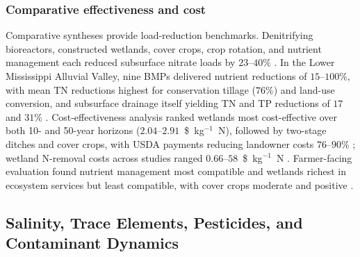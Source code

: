 \subsubsection{Comparative effectiveness and cost}

Comparative syntheses provide load-reduction benchmarks. Denitrifying
bioreactors, constructed wetlands, cover crops, crop rotation, and nutrient
management each reduced subsurface nitrate loads by $23$--$40\%$
\parencite{Yuan2022}. In the Lower Mississippi Alluvial Valley, nine BMPs
delivered nutrient reductions of $15$--$100\%$, with mean TN reductions
highest for conservation tillage ($76\%$) and land-use conversion, and
subsurface drainage itself yielding TN and TP reductions of $17$ and $31\%$
\parencite{Kröger2012}. Cost-effectiveness analysis ranked wetlands most
cost-effective over both 10- and 50-year horizons ($2.04$--$2.91$~\$~kg$^{-1}$~N),
followed by two-stage ditches and cover crops, with USDA payments reducing
landowner costs $76$--$90\%$ \parencite{Roley2016}; wetland N-removal costs
across studies ranged $0.66$--$58$~\$~kg$^{-1}$~N \parencite{Messer2021}.
Farmer-facing evaluation found nutrient management most compatible and
wetlands richest in ecosystem services but least compatible, with cover
crops moderate and positive \parencite{Christianson2014}.

\subsection{Salinity, Trace Elements, Pesticides, and Contaminant Dynamics}

